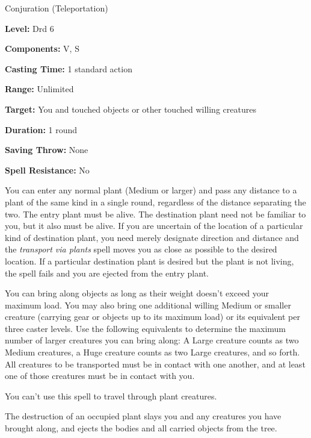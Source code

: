 
Conjuration (Teleportation)

\textbf{Level:} Drd 6

\textbf{Components:} V, S

\textbf{Casting Time:} 1 standard action

\textbf{Range:} Unlimited

\textbf{Target:} You and touched objects or other touched willing creatures

\textbf{Duration:} 1 round

\textbf{Saving Throw:} None

\textbf{Spell Resistance:} No

You can enter any normal plant (Medium or larger) and pass any distance to a plant 
of the same kind in a single round, regardless of the distance separating the two. 
The entry plant must be alive. The destination plant need not be familiar to you, 
but it also must be alive. If you are uncertain of the location of a particular 
kind of destination plant, you need merely designate direction and distance and 
the \textit{transport via plants} spell moves you as close as possible to the desired 
location. If a particular destination plant is desired but the plant is not living, 
the spell fails and you are ejected from the entry plant.

You can bring along objects as long as their weight doesn't exceed your maximum 
load. You may also bring one additional willing Medium or smaller creature (carrying 
gear or objects up to its maximum load) or its equivalent per three caster levels. 
Use the following equivalents to determine the maximum number of larger creatures 
you can bring along: A Large creature counts as two Medium creatures, a Huge creature 
counts as two Large creatures, and so forth. All creatures to be transported must 
be in contact with one another, and at least one of those creatures must be in 
contact with you.

You can't use this spell to travel through plant creatures.

The destruction of an occupied plant slays you and any creatures you have brought 
along, and ejects the bodies and all carried objects from the tree.

